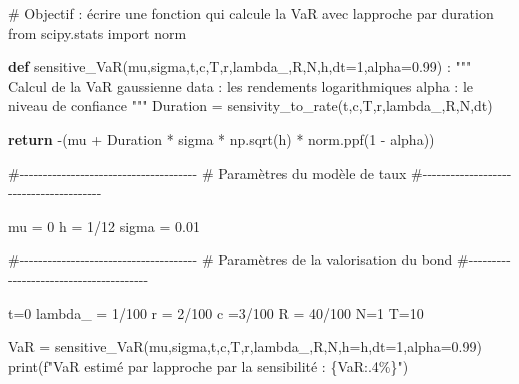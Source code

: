 \documentclass[
  letterpaper,
  DIV=11,
  numbers=noendperiod]{scrartcl}
\newenvironment{Shaded}{\begin{snugshade}}{\end{snugshade}}
\newcommand{\BuiltInTok}[1]{\textcolor[rgb]{0.00,0.23,0.31}{#1}}
\newcommand{\CommentTok}[1]{\textcolor[rgb]{0.37,0.37,0.37}{#1}}
\newcommand{\ControlFlowTok}[1]{\textcolor[rgb]{0.00,0.23,0.31}{\textbf{#1}}}
\newcommand{\DecValTok}[1]{\textcolor[rgb]{0.68,0.00,0.00}{#1}}
\newcommand{\FloatTok}[1]{\textcolor[rgb]{0.68,0.00,0.00}{#1}}
\newcommand{\ImportTok}[1]{\textcolor[rgb]{0.00,0.46,0.62}{#1}}
\newcommand{\KeywordTok}[1]{\textcolor[rgb]{0.00,0.23,0.31}{\textbf{#1}}}
\newcommand{\NormalTok}[1]{\textcolor[rgb]{0.00,0.23,0.31}{#1}}
\newcommand{\OperatorTok}[1]{\textcolor[rgb]{0.37,0.37,0.37}{#1}}
\newcommand{\SpecialCharTok}[1]{\textcolor[rgb]{0.37,0.37,0.37}{#1}}
\newcommand{\SpecialStringTok}[1]{\textcolor[rgb]{0.13,0.47,0.30}{#1}}
\begin{document}
\begin{Shaded}
\begin{Highlighting}[]
\CommentTok{\# Objectif : écrire une fonction qui calcule la VaR avec l\textquotesingle{}approche par duration}
\ImportTok{from}\NormalTok{ scipy.stats }\ImportTok{import}\NormalTok{ norm}

\KeywordTok{def}\NormalTok{ sensitive\_VaR(mu,sigma,t,c,T,r,lambda\_,R,N,h,dt}\OperatorTok{=}\DecValTok{1}\NormalTok{,alpha}\OperatorTok{=}\FloatTok{0.99}\NormalTok{) :}
    \CommentTok{"""}
\CommentTok{    Calcul de la VaR gaussienne}
\CommentTok{    data : les rendements logarithmiques}
\CommentTok{    alpha : le niveau de confiance}
\CommentTok{    """}
\NormalTok{    Duration }\OperatorTok{=}\NormalTok{ sensivity\_to\_rate(t,c,T,r,lambda\_,R,N,dt)}

    \ControlFlowTok{return} \OperatorTok{{-}}\NormalTok{(mu }\OperatorTok{+}\NormalTok{ Duration }\OperatorTok{*}\NormalTok{ sigma }\OperatorTok{*}\NormalTok{ np.sqrt(h) }\OperatorTok{*}\NormalTok{ norm.ppf(}\DecValTok{1} \OperatorTok{{-}}\NormalTok{ alpha))}

\CommentTok{\#{-}{-}{-}{-}{-}{-}{-}{-}{-}{-}{-}{-}{-}{-}{-}{-}{-}{-}{-}{-}{-}{-}{-}{-}{-}{-}{-}{-}{-}{-}{-}{-}{-}{-}{-}{-}{-}{-}}
\CommentTok{\# Paramètres du modèle de taux}
\CommentTok{\#{-}{-}{-}{-}{-}{-}{-}{-}{-}{-}{-}{-}{-}{-}{-}{-}{-}{-}{-}{-}{-}{-}{-}{-}{-}{-}{-}{-}{-}{-}{-}{-}{-}{-}{-}{-}{-}{-}{-}}

\NormalTok{mu }\OperatorTok{=} \DecValTok{0}
\NormalTok{h }\OperatorTok{=} \DecValTok{1}\OperatorTok{/}\DecValTok{12}
\NormalTok{sigma }\OperatorTok{=} \FloatTok{0.01}

\CommentTok{\#{-}{-}{-}{-}{-}{-}{-}{-}{-}{-}{-}{-}{-}{-}{-}{-}{-}{-}{-}{-}{-}{-}{-}{-}{-}{-}{-}{-}{-}{-}{-}{-}{-}{-}{-}{-}{-}{-}}
\CommentTok{\# Paramètres de la valorisation du bond}
\CommentTok{\#{-}{-}{-}{-}{-}{-}{-}{-}{-}{-}{-}{-}{-}{-}{-}{-}{-}{-}{-}{-}{-}{-}{-}{-}{-}{-}{-}{-}{-}{-}{-}{-}{-}{-}{-}{-}{-}{-}{-}}

\NormalTok{t}\OperatorTok{=}\DecValTok{0}
\NormalTok{lambda\_ }\OperatorTok{=} \DecValTok{1}\OperatorTok{/}\DecValTok{100}
\NormalTok{r }\OperatorTok{=} \DecValTok{2}\OperatorTok{/}\DecValTok{100}
\NormalTok{c }\OperatorTok{=}\DecValTok{3}\OperatorTok{/}\DecValTok{100}
\NormalTok{R }\OperatorTok{=} \DecValTok{40}\OperatorTok{/}\DecValTok{100}
\NormalTok{N}\OperatorTok{=}\DecValTok{1}
\NormalTok{T}\OperatorTok{=}\DecValTok{10}

\NormalTok{VaR }\OperatorTok{=}\NormalTok{ sensitive\_VaR(mu,sigma,t,c,T,r,lambda\_,R,N,h}\OperatorTok{=}\NormalTok{h,dt}\OperatorTok{=}\DecValTok{1}\NormalTok{,alpha}\OperatorTok{=}\FloatTok{0.99}\NormalTok{)}
\BuiltInTok{print}\NormalTok{(}\SpecialStringTok{f"VaR estimé par l\textquotesingle{}approche par la sensibilité : }\SpecialCharTok{\{}\NormalTok{VaR}\SpecialCharTok{:.4\%\}}\SpecialStringTok{"}\NormalTok{)}
\end{Highlighting}
\end{Shaded}
\end{document}
